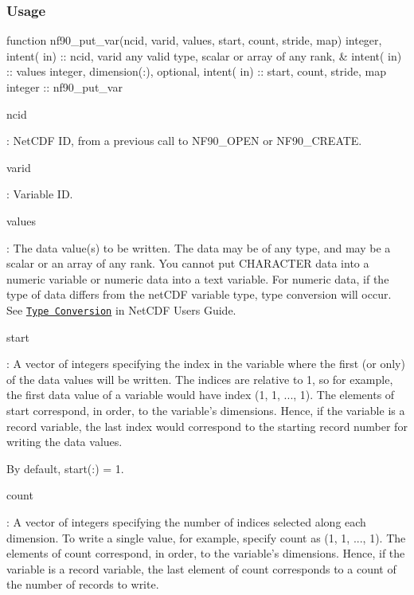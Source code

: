 \subsubsection*{Usage}


\begin{DoxyCode}
\textcolor{keyword}{function }nf90\_put\_var(ncid, varid, values, start, count, stride, map)
  \textcolor{keywordtype}{integer},                         \textcolor{keywordtype}{intent( in)} :: ncid, varid
  any valid \textcolor{keywordtype}{type}, scalar or array of any rank, &
                                   \textcolor{keywordtype}{intent( in)} :: values
  \textcolor{keywordtype}{integer}, \textcolor{keywordtype}{dimension(:)}, \textcolor{keywordtype}{optional}, \textcolor{keywordtype}{intent( in)} :: start, count, stride, map
  \textcolor{keywordtype}{integer}                                      :: nf90\_put\_var
\end{DoxyCode}


{\ttfamily ncid}

\+: Net\+C\+DF ID, from a previous call to N\+F90\+\_\+\+O\+P\+EN or N\+F90\+\_\+\+C\+R\+E\+A\+TE.

{\ttfamily varid}

\+: Variable ID.

{\ttfamily values}

\+: The data value(s) to be written. The data may be of any type, and may be a scalar or an array of any rank. You cannot put C\+H\+A\+R\+A\+C\+T\+ER data into a numeric variable or numeric data into a text variable. For numeric data, if the type of data differs from the net\+C\+DF variable type, type conversion will occur. See \href{netcdf.html#Type-Conversion}{\tt Type Conversion} in Net\+C\+DF Users Guide.

{\ttfamily start}

\+: A vector of integers specifying the index in the variable where the first (or only) of the data values will be written. The indices are relative to 1, so for example, the first data value of a variable would have index (1, 1, ..., 1). The elements of start correspond, in order, to the variable’s dimensions. Hence, if the variable is a record variable, the last index would correspond to the starting record number for writing the data values.

By default, start(\+:) = 1.

{\ttfamily count}

\+: A vector of integers specifying the number of indices selected along each dimension. To write a single value, for example, specify count as (1, 1, ..., 1). The elements of count correspond, in order, to the variable’s dimensions. Hence, if the variable is a record variable, the last element of count corresponds to a count of the number of records to write.


